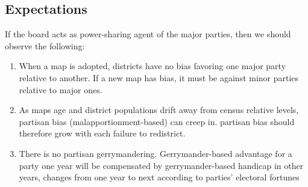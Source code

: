 \subsection{Expectations}

If the board acts as power-sharing agent of the major parties, then we should observe the following: 

\begin{enumerate}

\item When a map is adopted, districts have no bias favoring one major party relative to another. If a new map has bias, it must be against minor parties relative to major ones. 

\item As maps age and district populations drift away from census relative levels, partisan bias (malapportionment-based) can creep in. partisan bias should therefore grow with each failure to redistrict. 

\item There is no partisan gerrymandering. Gerrymander-based advantage for a party one year will be compensated by gerrymander-based handicap in other years, changes from one year to next according to parties' electoral fortunes

\end{enumerate}




